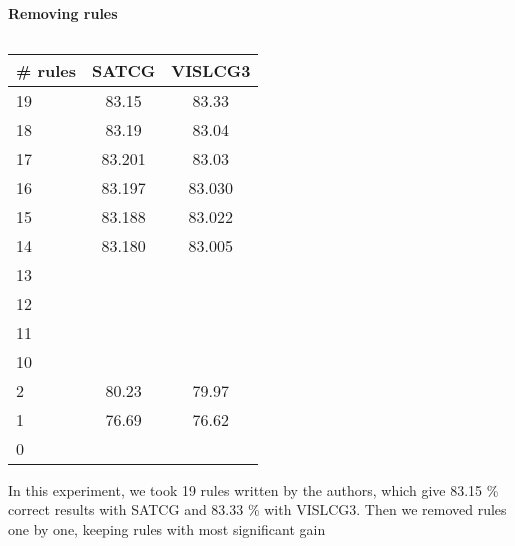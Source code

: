 \documentclass[11pt]{article}
\newcommand{\todo}[1]{{\color{cyan}\textbf{[TODO: }#1\textbf{]}}}
\begin{document}


\paragraph{Removing rules}
\begin{table}
  \centering
  \begin{tabular}{|l|c|c|}
     \hline
    \textbf{\# rules} & \textbf{SATCG} & \textbf{VISLCG3} \\
    \hline 
	19 &  83.15 & 83.33 \\ \hline  %
	18 &  83.19 & 83.04 \\ \hline  %
	17 &  83.201 & 83.03 \\ \hline   %
	16 &  83.197 & 83.030 \\ \hline  %
	15 &  83.188 & 83.022\\ \hline  %
	14 &  83.180 & 83.005 \\ \hline  
	13 &  & \\ \hline  
	12 &  & \\ \hline  
	11 &  & \\ \hline  
	10 &  & \\ \hline  
	2   & 80.23 & 79.97 \\ \hline
	1   & 76.69 & 76.62 \\ \hline
	0   & &  \\ \hline
  \end{tabular}
  \caption{}
  \label{table:results}
\end{table}
In this experiment, we took 19 rules written by the authors, which give 83.15 \% correct results with SATCG and 83.33 \% with VISLCG3.
Then we removed rules one by one, keeping rules with most significant gain 
\end{document}
